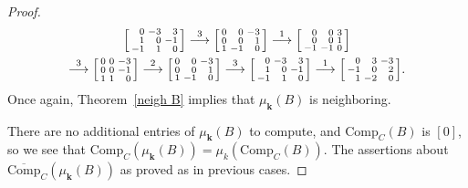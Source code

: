\documentclass{amsart}
\theoremstyle{definition}
\theoremstyle{remark}
\numberwithin{equation}{section}
\newcommand{\0}{{\mathbf{0}}}
\newcommand{\Comp}{\mathrm{Comp}_C}
\newcommand{\CompPlus}{\overline{\mathrm{Comp}}_C}
\newcommand{\kk}{{\boldsymbol{k}}}
\begin{document}
\begin{proof}
\begin{multline*}
\begin{bsmallmatrix*}[r]
0&-3&3\\
1&0&-1\\
-1&1&0
\end{bsmallmatrix*}
\overset{3}{\longrightarrow}
\begin{bsmallmatrix*}[r]
0&0&-3\\
0&0&1\\
1&-1&0
\end{bsmallmatrix*}
\overset{1}{\longrightarrow}
\begin{bsmallmatrix*}[r]
0&0&3\\
0&0&1\\
-1&-1&0
\end{bsmallmatrix*}\\
\overset{3}{\longrightarrow}
\begin{bsmallmatrix*}[r]
0&0&-3\\
0&0&-1\\
1&1&0
\end{bsmallmatrix*}
\overset{2}{\longrightarrow}
\begin{bsmallmatrix*}[r]
0&0&-3\\
0&0&1\\
1&-1&0
\end{bsmallmatrix*}
\overset{3}{\longrightarrow}
\begin{bsmallmatrix*}[r]
0&-3&3\\
1&0&-1\\
-1&1&0
\end{bsmallmatrix*}
\overset{1}{\longrightarrow}
\begin{bsmallmatrix*}[r]
0&3&-3\\
-1&0&2\\
1&-2&0
\end{bsmallmatrix*}.
\end{multline*}
Once again, Theorem~\ref{neigh B} implies that $\mu_\kk(B)$ is neighboring.

There are no additional entries of $\mu_\kk(B)$ to compute, and $\Comp(B)$ is $[0]$, so we see that $\Comp(\mu_\kk(B))=\mu_k(\Comp(B))$.
The assertions about $\CompPlus(\mu_\kk(B))$ as proved as in previous cases.


\end{proof}
\end{document}
